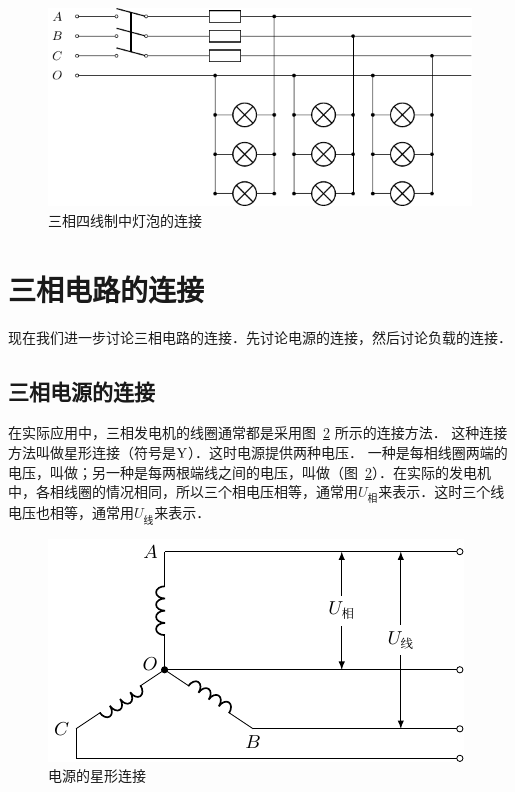\begin{figure}[htbp]
    \centering
    \includegraphics{fig/C/3-46.pdf}
    \caption{三相四线制中灯泡的连接}\label{fig_C_3-46}
\end{figure}

\section{三相电路的连接}
现在我们进一步讨论三相电路的连接．先讨论电源的连接，然后讨论负载的连接．

\subsection{三相电源的连接}

在实际应用中，三相发电机的线圈通常都是采用图~\ref{fig_C_3-47} 所示的连接方法．
这种连接方法叫做星形连接（符号是$\rm{Y}$）．这时电源提供两种电压．
一种是每相线圈两端的电压，叫做；另一种是每两根端线之间的电压，叫做（图~\ref{fig_C_3-47}）．在实际的发电机中，各相线圈的情况相同，所以三个相电压相等，通常用$U_{\text{相}}$来表示．这时三个线电压也相等，通常用$U_{\text{线}}$来表示．
\begin{figure}[htbp]
    \centering
    \includegraphics{fig/C/3-47.pdf}
    \caption{电源的星形连接}\label{fig_C_3-47}
\end{figure}

